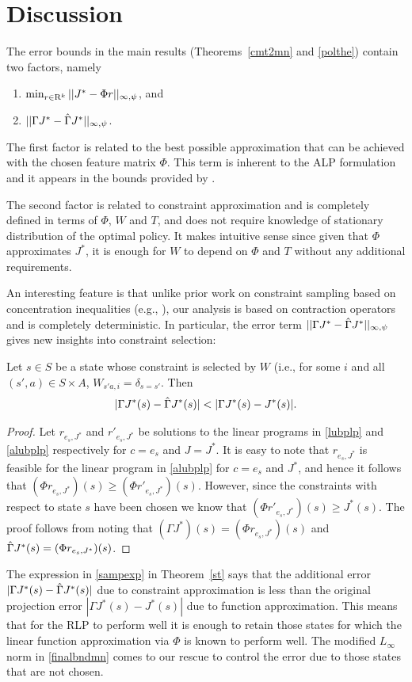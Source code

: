 \section{Discussion}
The error bounds in the main results (Theorems~\ref{cmt2mn} and \ref{polthe}) contain two factors, namely
\begin{enumerate}
\item $\min_{r\in \mathrm{R}^k} ||J^*-\Phi r||_{\infty,\psi}$, and
\item $||\Gamma J^*-\hat{\Gamma} J^*||_{\infty,\psi}$.
\end{enumerate}
The first factor is related to the best possible approximation that can be achieved with the chosen feature matrix $\Phi$. This term is inherent to the ALP formulation and it appears in the bounds provided by \cite{ALP}.\par
The second factor is related to constraint approximation and is completely defined in terms of $\Phi$, $W$ and $T$, and does not require knowledge of stationary distribution of the optimal policy. It makes intuitive sense since given that $\Phi$ approximates $J^*$, it is enough for $W$ to depend on $\Phi$ and $T$ without any additional requirements.\par An interesting feature is that unlike prior work on constraint sampling based on concentration inequalities (e.g.,  \cite{CS}), our analysis is based on contraction operators and is completely deterministic.
In particular, the error term $||\Gamma J^*-\hat{\Gamma} J^*||_{\infty,\psi}$ gives new insights into constraint selection:
\begin{theorem}\label{st}
Let $s\in S$ be a state whose constraint is selected by $W$ (i.e., for some $i$ and all $(s',a)\in S\times A$, 
$W_{s'a,i}=\delta_{s=s'}$. 
Then
\begin{align}\label{sampexp}
|\Gamma J^*(s)-\hg J^*(s)|<|\Gamma J^*(s)-J^*(s)|.
\end{align}
\end{theorem}
\begin{proof}
Let $r_{e_s,J^*}$ and ${r}'_{e_s,J^*}$ be solutions to the linear programs in \eqref{lubplp} and \eqref{alubplp} respectively for $c=e_s$ and $J=J^*$. It is easy to note that $r_{e_s,J^*}$ is feasible for the linear program in \eqref{alubplp} for $c=e_s$ and $J^*$, and hence it follows that $(\Phi r_{e_s,J^*})(s)\geq (\Phi {r}'_{e_s,J^*})(s)$. However, since the constraints with respect to state $s$ have been chosen we know that $(\Phi {r}'_{e_s,J^*})(s)\geq J^*(s)$. The proof follows from noting that $(\Gamma J^*)(s)=(\Phi r_{e_s,J^*})(s)$ and $\hat{\Gamma} J^*(s)=(\Phi {r}_{e_s,J^*})(s)$.
\end{proof}
The expression in \eqref{sampexp} in Theorem~\ref{st} says that the additional error $|\Gamma J^*(s) -\hat{\Gamma} J^*(s)|$ due to constraint approximation is less than the original projection error $|\Gamma J^*(s)-J^*(s)|$ due to function approximation. This means that for the RLP to perform well it is enough to retain those states for which the linear function approximation via $\Phi$ is known to perform well. The modified $L_\infty$ norm in \eqref{finalbndmn} comes to our rescue to control the error due to those states that are not chosen.